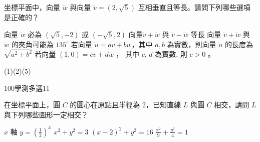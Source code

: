 \begin{QUESTIONS}
\begin{QUESTION}
\begin{ExamAnsRateInfo}{37}{64}{33}{14}
        \end{ExamAnsRateInfo}
        \begin{QBODY}
            坐標平面中，向量 $\lvec{w}$ 與向量 $\lvec{v} = (2,\sqrt{5})$ 互相垂直且等長。請問下列哪些選項是正確的？
			\begin{QOPS} 
				\QOP 向量 $\lvec{w}$ 必為 $(\sqrt{5},-2)$ 或 $(-\sqrt{5},2)$ 
				\QOP 向量$\lvec{v}+\lvec{w}$ 與 $\lvec{v}-\lvec{w}$ 等長 
				\QOP 向量 $\lvec{v}+\lvec{w}$ 與 $\lvec{w}$ 的夾角可能為 $135^\circ$ 
				\QOP 若向量 $\lvec{u}=a \lvec{v}+b \lvec{w}$，其中 $a,b$ 為實數，則向量 $\lvec{u}$ 的長度為 $\sqrt{a^2 +b^2}$ 
				\QOP 若向量 $(1,0)=c\lvec{v}+d \lvec{w}$ ， 其中 $c$, $d$ 為實數, 則 $c>0$ 。
			\end{QOPS}
        \end{QBODY}
        \begin{QFROMS}
        \end{QFROMS}
        \begin{QTAGS}\end{QTAGS}
        \begin{QANS}
            (1)(2)(5)
        \end{QANS}
        \begin{QSOLLIST}
        \end{QSOLLIST}
        \begin{QEMPTYSPACE}
        \end{QEMPTYSPACE}
    \end{QUESTION}
    \begin{QUESTION}
        \begin{ExamInfo}{100}{學測}{多選}{11}
        \end{ExamInfo}
        \begin{ExamAnsRateInfo}{47}{76}{46}{19}
        \end{ExamAnsRateInfo}
        \begin{QBODY}
            在坐標平面上，圓 $C$ 的圓心在原點且半徑為 2，已知直線 $L$ 與圓 $C$ 相交，請問 $L$ 與下列哪些圖形一定相交？ 
			\begin{QOPS}
				\QOP $x$ 軸 
				\QOP $y = (\frac{1}{2})^x$    
				\QOP  $x^2 +y^2 =3$    \QOP $(x-2)^2 +y^2 =16$ 
				\QOP $\frac{x^2}{9} +\frac{y^2}{4} =1$
			\end{QOPS}
        \end{QBODY}
        \begin{QFROMS}
        \end{QFROMS}
        \begin{QTAGS}\end{QTAGS}

\end{QUESTION}
\end{QUESTIONS}
